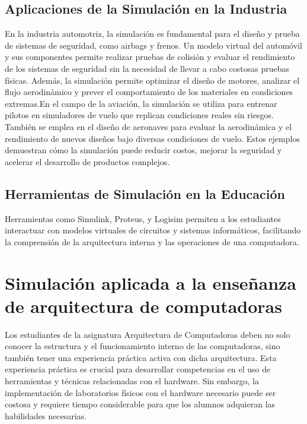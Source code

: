 \documentclass[12pt,twoside]{templates/unerthesis}
\begin{document}
\hypertarget{aplicaciones-de-la-simulaciuxf3n-en-la-industria}{%
\subsection{Aplicaciones de la Simulación en la Industria}\label{aplicaciones-de-la-simulaciuxf3n-en-la-industria}}

En la industria automotriz, la simulación es fundamental para el diseño y prueba de sistemas de seguridad, como airbags y frenos. Un modelo virtual del automóvil y sus componentes permite realizar pruebas de colisión y evaluar el rendimiento de los sistemas de seguridad sin la necesidad de llevar a cabo costosas pruebas físicas. Además, la simulación permite optimizar el diseño de motores, analizar el flujo aerodinámico y prever el comportamiento de los materiales en condiciones extremas.En el campo de la aviación, la simulación se utiliza para entrenar pilotos en simuladores de vuelo que replican condiciones reales sin riesgos. También se emplea en el diseño de aeronaves para evaluar la aerodinámica y el rendimiento de nuevos diseños bajo diversas condiciones de vuelo. Estos ejemplos demuestran cómo la simulación puede reducir costos, mejorar la seguridad y acelerar el desarrollo de productos complejos.

\hypertarget{herramientas-de-simulaciuxf3n-en-la-educaciuxf3n}{%
\subsection{Herramientas de Simulación en la Educación}\label{herramientas-de-simulaciuxf3n-en-la-educaciuxf3n}}

Herramientas como Simulink, Proteus, y Logisim permiten a los estudiantes interactuar con modelos virtuales de circuitos y sistemas informáticos, facilitando la comprensión de la arquitectura interna y las operaciones de una computadora.

\hypertarget{simulaciuxf3n-aplicada-a-la-enseuxf1anza-de-arquitectura-de-computadoras}{%
\section{Simulación aplicada a la enseñanza de arquitectura de computadoras}\label{simulaciuxf3n-aplicada-a-la-enseuxf1anza-de-arquitectura-de-computadoras}}

Los estudiantes de la asignatura Arquitectura de Computadoras deben no solo conocer la estructura y el funcionamiento interno de las computadoras, sino también tener una experiencia práctica activa con dicha arquitectura. Esta experiencia práctica es crucial para desarrollar competencias en el uso de herramientas y técnicas relacionadas con el hardware. Sin embargo, la implementación de laboratorios físicos con el hardware necesario puede ser costosa y requiere tiempo considerable para que los alumnos adquieran las habilidades necesarias.
\end{document}
